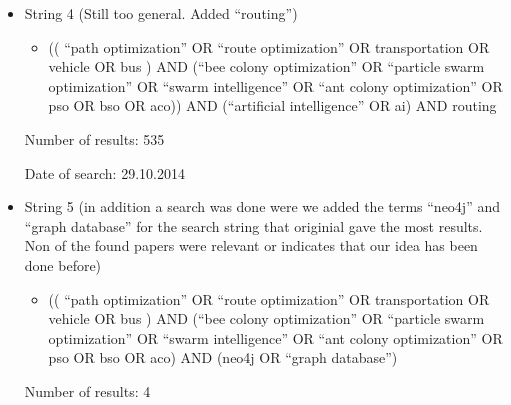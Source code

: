 \begin{itemize}
\item String 4 (Still too general. Added ``routing'')
\begin{itemize}
\item (( ``path optimization'' OR ``route optimization'' OR transportation OR vehicle OR bus ) AND (``bee colony optimization'' OR ``particle swarm optimization'' OR ``swarm intelligence'' OR ``ant colony optimization'' OR pso OR bso OR aco)) AND (``artificial intelligence'' OR ai) AND routing
\end{itemize}
\par Number of results: 535
\par Date of search: 29.10.2014
\end{itemize}
\begin{itemize}
\item String 5 (in addition a search was done were we added the terms ``neo4j'' and ``graph database'' for the search string that originial gave the most results. Non of the found papers were relevant or indicates that our idea has been done before)
\begin{itemize}
\item (( ``path optimization'' OR ``route optimization'' OR transportation OR vehicle OR bus ) AND (``bee colony optimization'' OR ``particle swarm optimization'' OR ``swarm intelligence'' OR ``ant colony optimization'' OR pso OR bso OR aco) AND (neo4j OR ``graph database'')
\end{itemize}
\par Number of results: 4 
\end{itemize}

